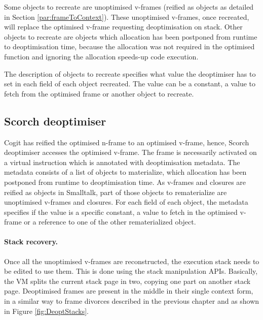 \documentclass[a4paper,12pt,twoside]{../includes/ThesisStyle}
\begin{document}
Some objects to recreate are unoptimised v-frames (reified as objects as detailed in Section \ref{par:frameToContext}). These unoptimised v-frames, once recreated, will replace the optimised v-frame requesting deoptimisation on stack. Other objects to recreate are objects which allocation has been postponed from runtime to deoptimisation time, because the allocation was not required in the optimised function and ignoring the allocation speeds-up code execution. 

The description of objects to recreate specifies what value the deoptimiser has to set in each field of each object recreated. The value can be a constant, a value to fetch from the optimised frame or another object to recreate.

\subsection{Scorch deoptimiser}

Cogit has reified the optimised n-frame to an optimised v-frame, hence, Scorch deoptimiser accesses the optimised v-frame. The frame is necessarily activated on a virtual instruction which is annotated with deoptimisation metadata. The metadata consists of a list of objects to materialize, which allocation has been postponed from runtime to deoptimisation time. As v-frames and closures are reified as objects in Smalltalk, part of those objects to rematerialize are unoptimised v-frames and closures. For each field of each object, the metadata specifies if the value is a specific constant, a value to fetch in the optimised v-frame or a reference to one of the other rematerialized object.

\paragraph{Stack recovery.}

Once all the unoptimised v-frames are reconstructed, the execution stack needs to be edited to use them. This is done using the stack manipulation APIs. Basically, the VM splits the current stack page in two, copying one part on another stack page. Deoptimised frames are present in the middle in their single context form, in a similar way to frame divorces described in the previous chapter and as shown in Figure \ref{fig:DeoptStacks}.
\end{document}
